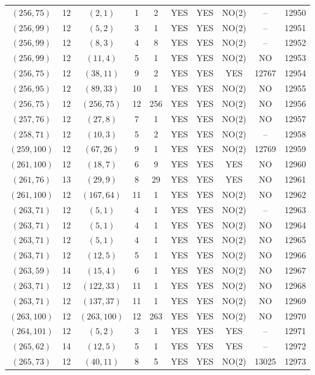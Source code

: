 \begin{longtable}{|c|c|c|c|c|c|c|c|c|c|}
$(256, 75)$ & 12 & $(2, 1)$ & 1 & 2 & YES & YES & NO(2) & -- & 12950\\
$(256, 99)$ & 12 & $(5, 2)$ & 3 & 1 & YES & YES & NO(2) & -- & 12951\\
$(256, 99)$ & 12 & $(8, 3)$ & 4 & 8 & YES & YES & NO(2) & -- & 12952\\
$(256, 99)$ & 12 & $(11, 4)$ & 5 & 1 & YES & YES & NO(2) & NO & 12953\\
$(256, 75)$ & 12 & $(38, 11)$ & 9 & 2 & YES & YES & YES & 12767 & 12954\\
$(256, 95)$ & 12 & $(89, 33)$ & 10 & 1 & YES & YES & NO(2) & NO & 12955\\
$(256, 75)$ & 12 & $(256, 75)$ & 12 & 256 & YES & YES & NO(2) & NO & 12956\\
$(257, 76)$ & 12 & $(27, 8)$ & 7 & 1 & YES & YES & NO(2) & NO & 12957\\
$(258, 71)$ & 12 & $(10, 3)$ & 5 & 2 & YES & YES & NO(2) & -- & 12958\\
$(259, 100)$ & 12 & $(67, 26)$ & 9 & 1 & YES & YES & NO(2) & 12769 & 12959\\
$(261, 100)$ & 12 & $(18, 7)$ & 6 & 9 & YES & YES & YES & NO & 12960\\
$(261, 76)$ & 13 & $(29, 9)$ & 8 & 29 & YES & YES & YES & NO & 12961\\
$(261, 100)$ & 12 & $(167, 64)$ & 11 & 1 & YES & YES & NO(2) & NO & 12962\\
$(263, 71)$ & 12 & $(5, 1)$ & 4 & 1 & YES & YES & NO(2) & -- & 12963\\
$(263, 71)$ & 12 & $(5, 1)$ & 4 & 1 & YES & YES & NO(2) & NO & 12964\\
$(263, 71)$ & 12 & $(5, 1)$ & 4 & 1 & YES & YES & NO(2) & NO & 12965\\
$(263, 71)$ & 12 & $(12, 5)$ & 5 & 1 & YES & YES & NO(2) & NO & 12966\\
$(263, 59)$ & 14 & $(15, 4)$ & 6 & 1 & YES & YES & NO(2) & NO & 12967\\
$(263, 71)$ & 12 & $(122, 33)$ & 11 & 1 & YES & YES & NO(2) & NO & 12968\\
$(263, 71)$ & 12 & $(137, 37)$ & 11 & 1 & YES & YES & NO(2) & NO & 12969\\
$(263, 100)$ & 12 & $(263, 100)$ & 12 & 263 & YES & YES & NO(2) & NO & 12970\\
$(264, 101)$ & 12 & $(5, 2)$ & 3 & 1 & YES & YES & YES & -- & 12971\\
$(265, 62)$ & 14 & $(12, 5)$ & 5 & 1 & YES & YES & YES & -- & 12972\\
$(265, 73)$ & 12 & $(40, 11)$ & 8 & 5 & YES & YES & NO(2) & 13025 & 12973\\

\end{longtable}
